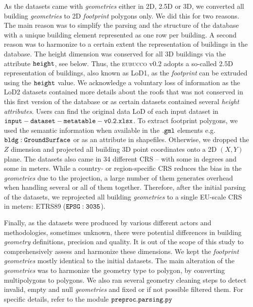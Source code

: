 \documentclass[fleqn,10pt]{wlscirep}
\begin{document}
As the datasets came with \textit{geometries} either in 2D, 2.5D or 3D, we converted all building \textit{geometries} to 2D \textit{footprint} polygons only. We did this for two reasons. The main reason was to simplify the parsing and the structure of the database with a unique building element represented as one row per building. A second reason was to harmonize to a certain extent the representation of buildings in the database. The height dimension was conserved for all 3D buildings via the attribute $\tt{height}$, see below. Thus, the \textsc{eubucco} v0.2 adopts a so-called 2.5D representation of buildings, also known as LoD1, as the \textit{footprint} can be extruded using the $\tt{height}$ value. We acknowledge a voluntary loss of information as the LoD2 datasets contained more details about the roofs that was not conserved in this first version of the database or as certain datasets contained several \textit{height} \textit{attributes}. Users can find the original data LoD of each input dataset in ${\tt input-dataset-metatable-v0.2.xlsx}$. To extract footprint polygons, we used the semantic information when available in the $\tt{.gml}$ elements e.g. $\tt{bldg:GroundSurface}$ or as an attribute in shapefiles. Otherwise, we dropped the $Z$ dimension and projected all building 3D point coordinates onto a 2D $(X,Y)$ plane. 
The datasets also came in 34 different CRS -- with some in degrees and some in meters. While a country- or region-specific CRS reduces the bias in the \textit{geometries} due to the projection, a large number of them generates overhead when handling several or all of them together. Therefore, after the initial parsing of the datasets, we reprojected all building \textit{geometries} to a single EU-scale CRS in meters: ETRS89 ($\tt{EPSG:3035}$).

Finally, as the datasets were produced by various different actors and methodologies, sometimes unknown, there were potential differences in building \textit{geometry} definitions, precision and quality. It is out of the scope of this study to comprehensively assess and harmonize these dimensions. We kept the \textit{footprint} \textit{geometries} mostly identical to the initial datasets. The main alteration of the \textit{geometries} was to harmonize the geometry type to polygon, by converting multipolygons to polygons. We also ran several geometry cleaning steps to detect invalid, empty and null \textit{geometries} and fixed or if not possible filtered them. For specific details, refer to the module $\tt{preproc.parsing.py}$ \cite{eubucco-0.2-code2022}
\end{document}
